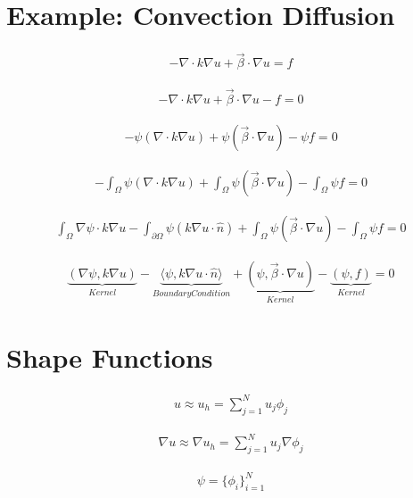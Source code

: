 \documentclass{article}
\begin{document}
	\section*{Example: Convection Diffusion}
	
	\begin{align*}
		-\nabla \cdot k \nabla u + \vec{\beta} \cdot \nabla u = f
	\end{align*}
	
	\begin{align*}
		-\nabla \cdot k \nabla u + \vec{\beta} \cdot \nabla u - f = 0
	\end{align*}
	
	\begin{align*}
		-\psi (\nabla \cdot k \nabla u) + \psi \left(\vec{\beta} \cdot \nabla u\right) - \psi f = 0
	\end{align*}
	
	\begin{align*}
		- \int_{\Omega} \psi (\nabla \cdot k \nabla u) + \int_{\Omega} \psi \left(\vec{\beta} \cdot \nabla u\right) - \int_{\Omega} \psi f = 0
	\end{align*}
	
	\begin{align*}
		\int_{\Omega} \nabla \psi \cdot k \nabla u - \int_{\partial \Omega} \psi (k \nabla u \cdot \hat{n}) + \int_{\Omega} \psi \left(\vec{\beta} \cdot \nabla u\right) - \int_{\Omega} \psi f = 0
	\end{align*}
	
	\begin{align*}
	\underbrace{(\nabla \psi , k \nabla u)}_{Kernel} - \underbrace{\langle \psi , k \nabla u \cdot \hat{n} \rangle}_{BoundaryCondition} + \underbrace{\left(\psi , \vec{\beta} \cdot \nabla u\right)}_{Kernel} - \underbrace{(\psi , f)}_{Kernel} = 0
	\end{align*}
	
	\section*{Shape Functions}
	
	\begin{align*}
		u \approx u_h = \sum_{j=1}^{N} u_j \phi_j
	\end{align*}
	
	\begin{align*}
		\nabla u \approx \nabla u_h = \sum_{j=1}^{N} u_j \nabla \phi_j
	\end{align*}
	
	\begin{align*}
		\psi = \{ \phi_i \}^{N}_{i=1} 
	\end{align*}
	
\end{document}
